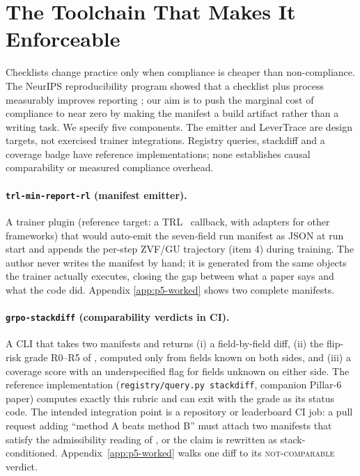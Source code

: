 \section{The Toolchain That Makes It Enforceable}
\label{sec:p5-toolchain}
Checklists change practice only when compliance is cheaper than
non-compliance. The NeurIPS reproducibility program showed that a checklist
plus process measurably improves reporting \citep{pineau2020improving}; our
aim is to push the marginal cost of compliance to near zero by making the
manifest a build artifact rather than a writing task. We specify five
components. The emitter and LeverTrace are design targets, not exercised
trainer integrations. Registry queries, stackdiff and a coverage badge have
reference implementations; none establishes causal comparability or
measured compliance overhead.

\paragraph{\texttt{trl-min-report-rl} (manifest emitter).} A trainer plugin
(reference target: a TRL~\citep{vonwerra2022trl} callback, with adapters for
other frameworks) that would auto-emit the
seven-field run manifest as JSON at run start and appends the per-step ZVF/GU
trajectory (item 4) during training. The author never writes the manifest by
hand; it is generated from the same objects the trainer actually executes,
closing the gap between what a paper says and what the code did. Appendix
\ref{app:p5-worked} shows two complete manifests.

\paragraph{\texttt{grpo-stackdiff} (comparability verdicts in CI).} A CLI
that takes two manifests and returns (i) a field-by-field diff, (ii) the
flip-risk grade R0--R5 of , computed only from fields
known on both sides, and (iii) a coverage score with an underspecified flag
for fields unknown on either side. The reference implementation
(\texttt{registry/query.py stackdiff}, companion Pillar-6 paper) computes
exactly this rubric and can exit with the grade as its status code. The
intended integration point is a repository or leaderboard CI job: a pull
request adding ``method A beats method B'' must attach two manifests that
satisfy the admissibility reading of , or the claim is
rewritten as stack-conditioned. Appendix~\ref{app:p5-worked} walks one diff
to its \textsc{not-comparable} verdict.

